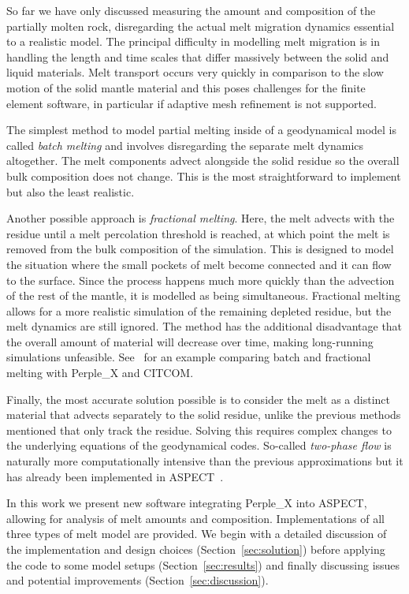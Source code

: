 \vspace{5mm}

So far we have only discussed measuring the amount and composition of the partially molten rock, disregarding the actual melt migration dynamics essential to a realistic model.
The principal difficulty in modelling melt migration is in handling the length and time scales that differ massively between the solid and liquid materials.
Melt transport occurs very quickly in comparison to the slow motion of the solid mantle material and this poses challenges for the finite element software, in particular if adaptive mesh refinement is not supported.

The simplest method to model partial melting inside of a geodynamical model is called \textit{batch melting} and involves disregarding the separate melt dynamics altogether.
The melt components advect alongside the solid residue so the overall bulk composition does not change.
This is the most straightforward to implement but also the least realistic.

Another possible approach is \textit{fractional melting}.
Here, the melt advects with the residue until a melt percolation threshold is reached, at which point the melt is removed from the bulk composition of the simulation.
This is designed to model the situation where the small pockets of melt become connected and it can flow to the surface.
Since the process happens much more quickly than the advection of the rest of the mantle, it is modelled as being simultaneous.
Fractional melting allows for a more realistic simulation of the remaining depleted residue, but the melt dynamics are still ignored.
The method has the additional disadvantage that the overall amount of material will decrease over time, making long-running simulations unfeasible.
See~\textcite{kaislaniemiLithosphereDestabilizationMelt2018} for an example comparing batch and fractional melting with Perple\_X and CITCOM.

Finally, the most accurate solution possible is to consider the melt as a distinct material that advects separately to the solid residue, unlike the previous methods mentioned that only track the residue.
\mbox{Solving} this requires complex changes to the underlying equations of the geodynamical codes.
So-called \textit{two-phase flow} is naturally more computationally intensive than the previous approximations but it has already been implemented in ASPECT~\parencite{dannbergCompressibleMagmaMantle2016}.

\vspace{5mm}

In this work we present new software integrating Perple\_X into ASPECT, allowing for analysis of melt amounts and composition.
Implementations of all three types of melt model are provided.
We begin with a detailed discussion of the implementation and design choices (Section~\ref{sec:solution}) before applying the code to some model setups (Section~\ref{sec:results}) and finally discussing issues and potential improvements (Section~\ref{sec:discussion}).
